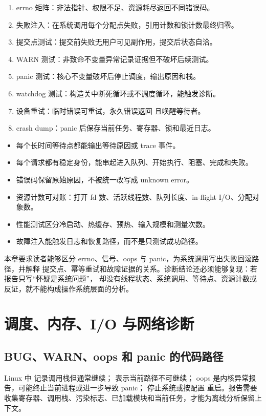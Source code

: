 \begin{enumerate}
\tightlist
\item errno 矩阵：非法指针、权限不足、资源耗尽返回不同错误码。
\item 失败注入：在系统调用每个分配点失败，引用计数和锁计数最终归零。
\item 提交点测试：提交前失败无用户可见副作用，提交后状态自洽。
\item WARN 测试：非致命不变量异常记录证据但不破坏后续测试。
\item panic 测试：核心不变量破坏后停止调度，输出原因和栈。
\item watchdog 测试：构造关中断死循环或不调度循环，能触发诊断。
\item 设备重试：临时错误可重试，永久错误返回  且唤醒等待者。
\item crash dump：panic 后保存当前任务、寄存器、锁和最近日志。
\end{enumerate}

\begin{itemize}
\tightlist
\item 每个长时间等待点都能输出等待原因或 trace 事件。
\item 每个请求都有稳定身份，能串起进入队列、开始执行、阻塞、完成和失败。
\item 错误码保留原始原因，不被统一改写成 unknown error。
\item 资源计数可对账：打开 fd 数、活跃线程数、队列长度、in-flight I/O、分配对象数。
\item 性能测试区分冷启动、热缓存、预热、输入规模和测量次数。
\item 故障注入能触发日志和恢复路径，而不是只测试成功路径。
\end{itemize}

本章要求读者能够区分 errno、信号、oops 与 panic，为系统调用写出失败回滚路径，并解释
提交点、幂等重试和故障证据的关系。诊断结论还必须能够复现：若报告只写“怀疑是系统问题”，
却没有线程状态、系统调用、等待点、资源计数或反证，就不能构成操作系统层面的分析。

\section{调度、内存、I/O 与网络诊断}

\subsection{BUG、WARN、oops 和 panic 的代码路径}

Linux 中  记录调用栈但通常继续； 表示当前路径不可继续；
oops 是内核异常报告，可能终止当前进程或进一步导致 panic； 停止系统或按配置
重启。报告需要收集寄存器、调用栈、污染标志、已加载模块和当前任务，才能为离线分析保留上下文。

